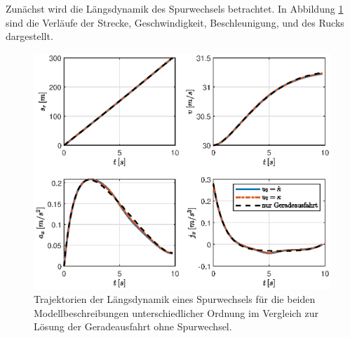 Zunächst wird die Längsdynamik des Spurwechsels betrachtet. In Abbildung \ref{fig:svaj_s300_v30} sind die Verläufe der Strecke, Geschwindigkeit, Beschleunigung, und des Rucks dargestellt. 
\begin{figure}[h] 
	\centering
	\includegraphics[width=\linewidth]{./Bilder/Ergebnisse/Geradeausfahrt/Spurwechsel/svaj_s300_v30.eps}
	\caption{Trajektorien der Längsdynamik eines Spurwechsels für die beiden Modellbeschreibungen unterschiedlicher Ordnung im Vergleich zur Lösung der Geradeausfahrt ohne Spurwechsel.}
	\label{fig:svaj_s300_v30}
\end{figure} 
